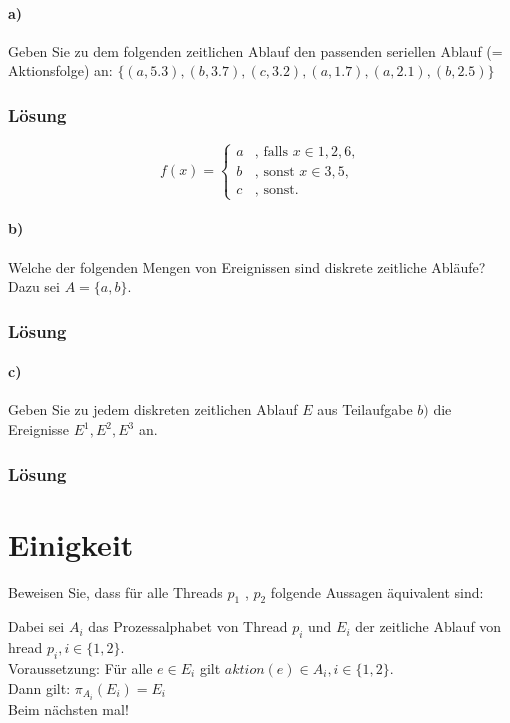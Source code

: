 \documentclass[a4paper]{scrartcl}
\begin{document}
\paragraph{a)} Geben Sie zu dem folgenden zeitlichen Ablauf den passenden seriellen Ablauf (= Aktionsfolge) an:
$ \{(a, 5.3), (b, 3.7), (c, 3.2), (a, 1.7), (a, 2.1), (b, 2.5)\}$

\subsubsection*{Lösung}
\begin{equation*}
\ f(x) = 
\begin{cases}
a & \text{, falls } x \in {1,2,6},\\
b & \text{, sonst } x \in {3,5},\\
c & \text{, sonst.}
\end{cases}
\end{equation*}

\paragraph{b)} Welche der folgenden Mengen von Ereignissen sind diskrete zeitliche Abläufe? Dazu sei $ A = \{a, b\} $.  

\subsubsection*{Lösung}

\paragraph{c)} Geben Sie zu jedem diskreten zeitlichen Ablauf $ E $ aus Teilaufgabe $ b) $ die Ereignisse $E^1, E^2, E^3 $ an.

\subsubsection*{Lösung}

\section{Einigkeit}
Beweisen Sie, dass für alle Threads $ p_1 $ , $ p_2 $ folgende Aussagen äquivalent sind:


Dabei sei $ A_i $ das Prozessalphabet von Thread $ p_i $ und $ E_i $ der zeitliche Ablauf von hread $ p_i , i \in \{1,2\}$.\\
Voraussetzung: Für alle $ e \in E_i $ gilt $aktion(e) \in A_i, i \in \{1,2\}$.\\
Dann gilt: $ \pi_{A_i}(E_i) = E_i$
\\
Beim nächsten mal!
\end{document}
